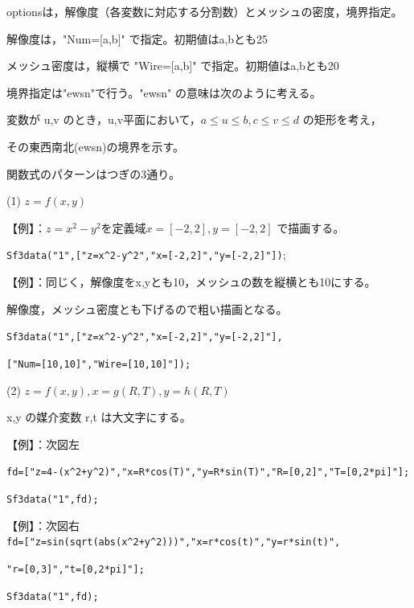 \documentclass[papersize,a4paper,12pt,uplatex]{jsarticle}
\begin{document}
\begin{description}
optionsは，解像度（各変数に対応する分割数）とメッシュの密度，境界指定。

解像度は，"Num=[a,b]" で指定。初期値はa,bとも25

メッシュ密度は，縦横で "Wire=[a,b]" で指定。初期値はa,bとも20

境界指定は"ewsn"で行う。"ewsn" の意味は次のように考える。

変数が u,v のとき，u,v平面において，$a \leq u \leq b,c \leq v \leq d$ の矩形を考え，

その東西南北(ewsn)の境界を示す。

 \begin{center}  \end{center}

\vspace{\baselineskip}
関数式のパターンはつぎの3通り。

\vspace{\baselineskip}
(1) $z=f(x,y)$

 【例】：$z=x^2-y^2$を定義域$x=[-2,2],y=[-2,2]$ で描画する。
  
  \verb|Sf3data("1",["z=x^2-y^2","x=[-2,2]","y=[-2,2]"])|;
      
  \begin{center}  \end{center}

 【例】：同じく，解像度をx,yとも10，メッシュの数を縦横とも10にする。
 
 解像度，メッシュ密度とも下げるので粗い描画となる。
   
\verb|Sf3data("1",["z=x^2-y^2","x=[-2,2]","y=[-2,2]"],|
      
\verb|["Num=[10,10]","Wire=[10,10]"]);|
  
\vspace{\baselineskip}
(2) $z=f(x,y),x=g(R,T),y=h(R,T)$

 x,y の媒介変数 r,t は大文字にする。
    
\vspace{\baselineskip}
【例】：次図左
  
\verb|fd=["z=4-(x^2+y^2)","x=R*cos(T)","y=R*sin(T)","R=[0,2]","T=[0,2*pi]"];|

 \verb|Sf3data("1",fd);|
    
【例】：次図右\\
 \verb|fd=["z=sin(sqrt(abs(x^2+y^2)))","x=r*cos(t)","y=r*sin(t)",|

\verb|"r=[0,3]","t=[0,2*pi]"];|
 
\verb|Sf3data("1",fd);|


\end{description}
\end{document}
